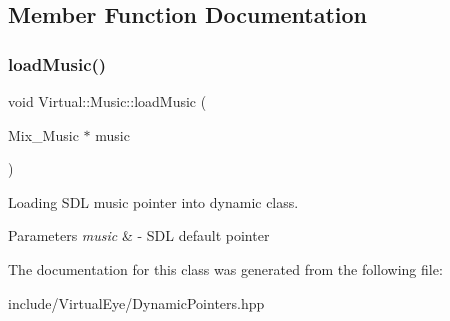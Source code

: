 \subsection{Member Function Documentation}
\hypertarget{class_virtual_1_1_music_a0fc4f3eab54d97628eb130a00794ecd8}{}\label{class_virtual_1_1_music_a0fc4f3eab54d97628eb130a00794ecd8} 
\subsubsection{\texorpdfstring{load\+Music()}{loadMusic()}}
{\footnotesize\ttfamily void Virtual\+::\+Music\+::load\+Music (\begin{DoxyParamCaption}\item[{Mix\+\_\+\+Music $\ast$}]{music }\end{DoxyParamCaption})}



Loading S\+DL music pointer into dynamic class. 


\begin{DoxyParams}{Parameters}
{\em music} & -\/ S\+DL default pointer \\
\hline
\end{DoxyParams}


The documentation for this class was generated from the following file\+:\begin{DoxyCompactItemize}
\item 
include/\+Virtual\+Eye/Dynamic\+Pointers.\+hpp\end{DoxyCompactItemize}
